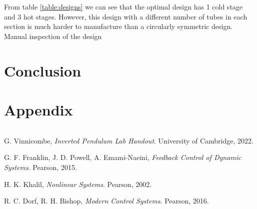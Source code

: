 \documentclass{article}
\begin{document}
From table \ref{table:designs} we can see that the optimal design has 1 cold stage and 3 hot stages.
However, this design with a different number of tubes in each section is much harder to manufacture than a circularly symmetric design.
Manual inspection of the design 

\section{Conclusion}


\newpage
\section{Appendix}

\begin {lstlisting}[language=Python]

\end{lstlisting}


\newpage
\begin{thebibliography}{9}

  G. Vinnicombe,
  \emph{Inverted Pendulum Lab Handout}.
  University of Cambridge,
  2022.

  G. F. Franklin, J. D. Powell, A. Emami-Naeini,
  \emph{Feedback Control of Dynamic Systems}.
  Pearson,
  2015.

  H. K. Khalil,
  \emph{Nonlinear Systems}.
  Pearson,
  2002.

  R. C. Dorf, R. H. Bishop,
  \emph{Modern Control Systems}.
  Pearson,
  2016.

\end{thebibliography}
\end{document}
